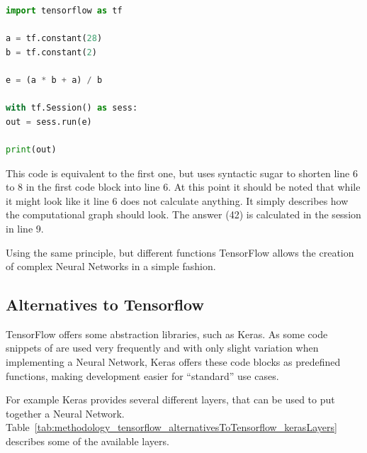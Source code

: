 \begin{lstlisting}[language=python]
import tensorflow as tf

a = tf.constant(28)
b = tf.constant(2)

e = (a * b + a) / b

with tf.Session() as sess:
out = sess.run(e)

print(out)
\end{lstlisting}

This code is equivalent to the first one, but uses syntactic sugar to shorten line 6 to 8 in the first code block into line 6. At this point it should be noted that while it might look like it line 6 does not calculate anything. It simply describes how the computational graph should look. The answer (42) is calculated in the session in line 9.

Using the same principle, but different functions TensorFlow allows the creation of complex Neural Networks in a simple fashion.

\subsection{Alternatives to Tensorflow}
TensorFlow offers some abstraction libraries, such as Keras. As some code snippets of are used very frequently and with only slight variation when implementing a Neural Network, Keras offers these code blocks as predefined functions, making development easier for ``standard'' use cases.

For example Keras provides several different layers, that can be used to put together a Neural Network. Table~\ref{tab:methodology_tensorflow_alternativesToTensorflow_kerasLayers} describes some of the available layers.

